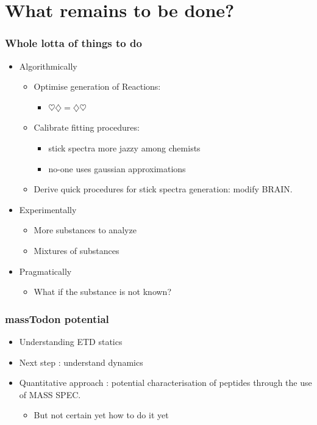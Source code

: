 \documentclass[xetex]{beamer}
\begin{document}
\section[Plans]{What remains to be done?}

	\begin{frame}\frametitle{Whole lotta of things to do}
		\begin{itemize}
			\item Algorithmically 
			\begin{itemize}
				\item Optimise generation of Reactions: 
				\begin{itemize}
					\item $\heartsuit \diamondsuit = \diamondsuit \heartsuit$
				\end{itemize}
				\item Calibrate fitting procedures: 
				\begin{itemize}
					\item stick spectra more jazzy among chemists
					\item no-one uses gaussian approximations
				\end{itemize}
				\item Derive quick procedures for stick spectra generation: modify BRAIN.
			\end{itemize}
			\item Experimentally
			\begin{itemize}
				\item More substances to analyze
				\item Mixtures of substances 
			\end{itemize}
			\item Pragmatically
			\begin{itemize}
				\item What if the substance is not known?
			\end{itemize}
		\end{itemize}
	\end{frame}

	\begin{frame}\frametitle{massTodon potential}
		\begin{itemize}
			\item Understanding ETD statics
			\item Next step : understand dynamics
			\item Quantitative approach : potential characterisation of peptides through the use of MASS SPEC.
			\begin{itemize}
				\item But not certain yet how to do it yet
			\end{itemize}

		\end{itemize}
	\end{frame}
\end{document}
